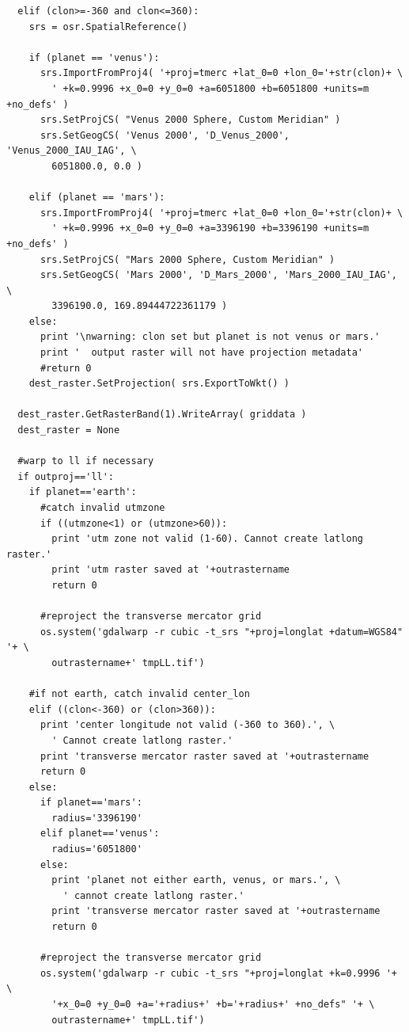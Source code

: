 \documentclass[12pt,letter]{article}
\begin{document}
\begin{verbatim}
  elif (clon>=-360 and clon<=360):
    srs = osr.SpatialReference()
    
    if (planet == 'venus'):
      srs.ImportFromProj4( '+proj=tmerc +lat_0=0 +lon_0='+str(clon)+ \
        ' +k=0.9996 +x_0=0 +y_0=0 +a=6051800 +b=6051800 +units=m +no_defs' )
      srs.SetProjCS( "Venus 2000 Sphere, Custom Meridian" )
      srs.SetGeogCS( 'Venus 2000', 'D_Venus_2000', 'Venus_2000_IAU_IAG', \
        6051800.0, 0.0 )
    
    elif (planet == 'mars'):
      srs.ImportFromProj4( '+proj=tmerc +lat_0=0 +lon_0='+str(clon)+ \
        ' +k=0.9996 +x_0=0 +y_0=0 +a=3396190 +b=3396190 +units=m +no_defs' )
      srs.SetProjCS( "Mars 2000 Sphere, Custom Meridian" )
      srs.SetGeogCS( 'Mars 2000', 'D_Mars_2000', 'Mars_2000_IAU_IAG', \
        3396190.0, 169.89444722361179 )
    else:
      print '\nwarning: clon set but planet is not venus or mars.'
      print '  output raster will not have projection metadata'
      #return 0
    dest_raster.SetProjection( srs.ExportToWkt() )
  
  dest_raster.GetRasterBand(1).WriteArray( griddata )
  dest_raster = None
  
  #warp to ll if necessary
  if outproj=='ll':
    if planet=='earth':
      #catch invalid utmzone
      if ((utmzone<1) or (utmzone>60)):
        print 'utm zone not valid (1-60). Cannot create latlong raster.'
        print 'utm raster saved at '+outrastername
        return 0
      
      #reproject the transverse mercator grid
      os.system('gdalwarp -r cubic -t_srs "+proj=longlat +datum=WGS84" '+ \
        outrastername+' tmpLL.tif')
      
    #if not earth, catch invalid center_lon
    elif ((clon<-360) or (clon>360)):
      print 'center longitude not valid (-360 to 360).', \
        ' Cannot create latlong raster.'
      print 'transverse mercator raster saved at '+outrastername
      return 0
    else:
      if planet=='mars':
        radius='3396190'
      elif planet=='venus':
        radius='6051800'
      else:
        print 'planet not either earth, venus, or mars.', \
          ' cannot create latlong raster.'
        print 'transverse mercator raster saved at '+outrastername
        return 0
      
      #reproject the transverse mercator grid
      os.system('gdalwarp -r cubic -t_srs "+proj=longlat +k=0.9996 '+ \
        '+x_0=0 +y_0=0 +a='+radius+' +b='+radius+' +no_defs" '+ \
        outrastername+' tmpLL.tif')
      

\end{verbatim}
\end{document}
